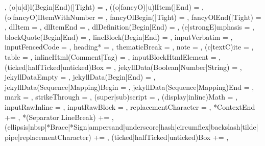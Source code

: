 {{    },
  (o|u|d)l(Begin|End)(|Tight) = {%
    },
  ((o|fancyO)|u)lItem(|End) = {%
    },
  (o|fancyO)lItemWithNumber = {%
    },
  fancyOlBegin(|Tight) = {%
    },
  fancyOlEnd(|Tight) = {%
    },
  dlItem = {%
    },
  dlItemEnd = {%
    },
  dlDefinition(Begin|End) = {%
    },
  (e|strongE)mphasis = {%
    },
  blockQuote(Begin|End) = {%
    },
  lineBlock(Begin|End) = {%
    },
  inputVerbatim = {%
    },
  inputFencedCode = {%
    },
  heading* = {%
    },
  thematicBreak = {%
    },
  note = {%
    },
  (c|textC)ite = {%
    },
  table = {%
    },
  inlineHtml(Comment|Tag) = {%
    },
  inputBlockHtmlElement = {%
    },
  (ticked|halfTicked|unticked)Box = {%
    },
  jekyllData(Boolean|Number|String) = {%
    },
  jekyllDataEmpty = {%
    },%
  jekyllData(Begin|End) = {%
    },
  jekyllData(Sequence|Mapping)Begin = {%
    },
  jekyllData(Sequence|Mapping)End = {%
    },
  mark = {%
    },
  strikeThrough = {%
    },
  (super|sub)script = {%
    },
  (display|inline)Math = {%
    },
  inputRawInline = {%
    },
  inputRawBlock = {%
    },
  replacementCharacter = {%
    },
  *ContextEnd += {\GOBBLE},
  *(Separator|LineBreak) += {\GOBBLE},
  (ellipsis|nbsp|*Brace|*Sign|ampersand|underscore|hash|circumflex|backslash|tilde|pipe|replacementCharacter) += {\GOBBLE},
  (ticked|halfTicked|unticked)Box += {\GOBBLE},
}%
